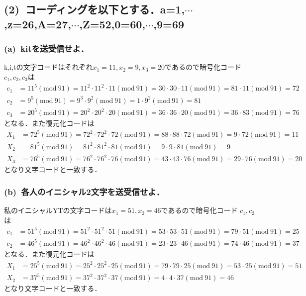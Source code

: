 \documentclass[a4paper,12pt]{jarticle}
\begin{document}
\subsection*{(2)~コーディングを以下とする．a=1,$\cdots$,z=26,A=27,$\cdots$,Z=52,0=60,$\cdots$,9=69}
\vspace{-3mm}
\subsubsection*{(a)~kitを送受信せよ．}
\vspace{-4mm}
k,i,tの文字コードはそれぞれ$x_1=11,x_2=9,x_3=20$であるので暗号化コード
$c_1,c_2,c_3$は
%
\begin{align*}
 c_1&=11^5(\mathrm{mod}~91)=11^2\cdot11^2\cdot11(\mathrm{mod}~91)=30\cdot30\cdot11(\mathrm{mod}~91)=81\cdot11(\mathrm{mod}~91)=72\\
 c_2&=9^5(\mathrm{mod}~91)=9^3\cdot9^2(\mathrm{mod}~91)=1\cdot9^2(\mathrm{mod}~91)=81\\
 c_3&=20^5(\mathrm{mod}~91)=20^2\cdot20^2\cdot20(\mathrm{mod}~91)=36\cdot36\cdot20(\mathrm{mod}~91)=36\cdot83(\mathrm{mod}~91)=76
\end{align*}
%
となる．また復元化コードは
%
\begin{align*}
 X_1&=72^5(\mathrm{mod}~91)=72^2\cdot72^2\cdot72(\mathrm{mod}~91)=88\cdot88\cdot72(\mathrm{mod}~91)=9\cdot72(\mathrm{mod}~91)=11\\
 X_2&=81^5(\mathrm{mod}~91)=81^2\cdot81^2\cdot81(\mathrm{mod}~91)=9\cdot9\cdot81(\mathrm{mod}~91)=9\\
 X_3&=76^5(\mathrm{mod}~91)=76^2\cdot76^2\cdot76(\mathrm{mod}~91)=43\cdot43\cdot76(\mathrm{mod}~91)=29\cdot76(\mathrm{mod}~91)=20
\end{align*}
%
となり文字コードと一致する．
\vspace{-7mm}
\subsubsection*{(b)~各人のイニシャル2文字を送受信せよ．}
\vspace{-4mm}
私のイニシャルYTの文字コードは$x_1=51,x_2=46$であるので暗号化コード
$c_1,c_2$は
%
\begin{align*}
 c_1&=51^5(\mathrm{mod}~91)=51^2\cdot51^2\cdot51(\mathrm{mod}~91)=53\cdot53\cdot51(\mathrm{mod}~91)=79\cdot51(\mathrm{mod}~91)=25\\
 c_2&=46^5(\mathrm{mod}~91)=46^2\cdot46^2\cdot46(\mathrm{mod}~91)=23\cdot23\cdot46(\mathrm{mod}~91)=74\cdot46(\mathrm{mod}~91)=37
\end{align*}
%
となる．また復元化コードは
%
\begin{align*}
 X_1&=25^5(\mathrm{mod}~91)=25^2\cdot25^2\cdot25(\mathrm{mod}~91)=79\cdot79\cdot25(\mathrm{mod}~91)=53\cdot25(\mathrm{mod}~91)=51\\
 X_2&=37^5(\mathrm{mod}~91)=37^2\cdot37^2\cdot37(\mathrm{mod}~91)=4\cdot4\cdot37(\mathrm{mod}~91)=46
\end{align*}
%
となり文字コードと一致する．
\vspace{-7mm}
\end{document}
